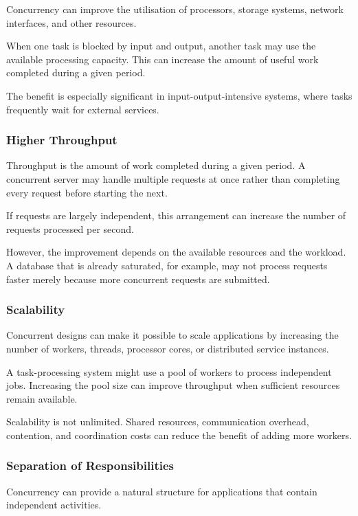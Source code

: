 Concurrency can improve the utilisation of processors, storage systems, network interfaces, and other resources.

When one task is blocked by input and output, another task may use the available processing capacity. This can increase the amount of useful work completed during a given period.

The benefit is especially significant in input-output-intensive systems, where tasks frequently wait for external services.

\subsubsection{Higher Throughput}

Throughput is the amount of work completed during a given period. A concurrent server may handle multiple requests at once rather than completing every request before starting the next.

If requests are largely independent, this arrangement can increase the number of requests processed per second.

However, the improvement depends on the available resources and the workload. A database that is already saturated, for example, may not process requests faster merely because more concurrent requests are submitted.

\subsubsection{Scalability}

Concurrent designs can make it possible to scale applications by increasing the number of workers, threads, processor cores, or distributed service instances.

A task-processing system might use a pool of workers to process independent jobs. Increasing the pool size can improve throughput when sufficient resources remain available.

Scalability is not unlimited. Shared resources, communication overhead, contention, and coordination costs can reduce the benefit of adding more workers.

\subsubsection{Separation of Responsibilities}

Concurrency can provide a natural structure for applications that contain independent activities.

